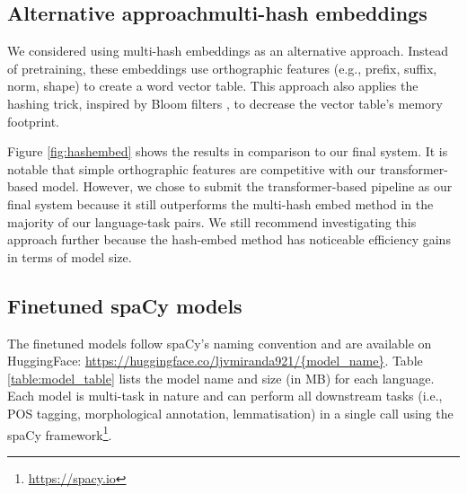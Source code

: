 \documentclass[11pt]{article}
\begin{document}
\subsection{Alternative approach\textemdash multi-hash embeddings}

We considered using multi-hash embeddings \cite{miranda-etal-2022-multi} as an alternative approach.
Instead of pretraining, these embeddings use orthographic features (e.g., prefix, suffix, norm, shape) to create a word vector table.
This approach also applies the hashing trick, inspired by Bloom filters \cite{bloom-1970-space}, to decrease the vector table's memory footprint.



Figure \ref{fig:hashembed} shows the results in comparison to our final system.
It is notable that simple orthographic features are competitive with our transformer-based model.
However, we chose to submit the transformer-based pipeline as our final system because it still outperforms the multi-hash embed method in the majority of our language-task pairs.
We still recommend investigating this approach further because the hash-embed method has noticeable efficiency gains in terms of model size.

\subsection{Finetuned spaCy models}

The finetuned models follow spaCy's naming convention and are available on HuggingFace: \url{https://huggingface.co/ljvmiranda921/{model\_name}}.
Table \ref{table:model_table} lists the model name and size (in MB) for each language.
Each model is multi-task in nature and can perform all downstream tasks (i.e., POS tagging, morphological annotation, lemmatisation) in a single call using the spaCy framework\footnote[3]{\url{https://spacy.io}}.
\end{document}
